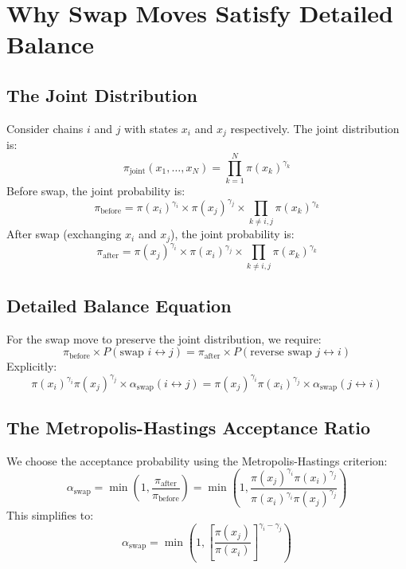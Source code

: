 \documentclass[12pt]{article}
\begin{document}
\section{Why Swap Moves Satisfy Detailed Balance}
\subsection{The Joint Distribution}
Consider chains $i$ and $j$ with states $x_i$ and $x_j$ respectively. The joint distribution is:
\begin{equation}
\pi_{\text{joint}}(x_1, \ldots, x_N) = \prod_{k=1}^{N} \pi(x_k)^{\gamma_k}
\end{equation}
Before swap, the joint probability is:
\begin{equation}
\pi_{\text{before}} = \pi(x_i)^{\gamma_i} \times \pi(x_j)^{\gamma_j} \times \prod_{k \neq i,j} \pi(x_k)^{\gamma_k}
\end{equation}
After swap (exchanging $x_i$ and $x_j$), the joint probability is:
\begin{equation}
\pi_{\text{after}} = \pi(x_j)^{\gamma_i} \times \pi(x_i)^{\gamma_j} \times \prod_{k \neq i,j} \pi(x_k)^{\gamma_k}
\end{equation}
\subsection{Detailed Balance Equation}
For the swap move to preserve the joint distribution, we require:
\begin{equation}
\pi_{\text{before}} \times P(\text{swap } i \leftrightarrow j) = \pi_{\text{after}} \times P(\text{reverse swap } j \leftrightarrow i)
\end{equation}
Explicitly:
\begin{equation}
\pi(x_i)^{\gamma_i} \pi(x_j)^{\gamma_j} \times \alpha_{\text{swap}}(i \leftrightarrow j) = \pi(x_j)^{\gamma_i} \pi(x_i)^{\gamma_j} \times \alpha_{\text{swap}}(j \leftrightarrow i)
\end{equation}
\subsection{The Metropolis-Hastings Acceptance Ratio}
We choose the acceptance probability using the Metropolis-Hastings criterion:
\begin{equation}
\alpha_{\text{swap}} = \min\left(1, \frac{\pi_{\text{after}}}{\pi_{\text{before}}}\right) = \min\left(1, \frac{\pi(x_j)^{\gamma_i} \pi(x_i)^{\gamma_j}}{\pi(x_i)^{\gamma_i} \pi(x_j)^{\gamma_j}}\right)
\end{equation}
This simplifies to:
\begin{equation}
\alpha_{\text{swap}} = \min\left(1, \left[\frac{\pi(x_j)}{\pi(x_i)}\right]^{\gamma_i - \gamma_j}\right)
\end{equation}
\end{document}
